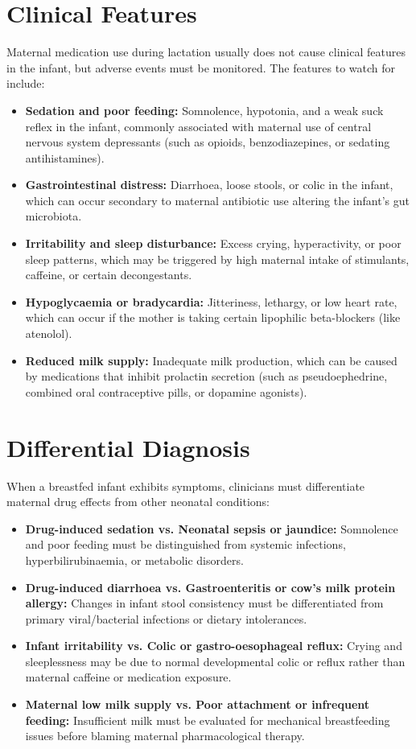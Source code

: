 \section*{Clinical Features}
Maternal medication use during lactation usually does not cause clinical features in the infant, but adverse events must be monitored. The features to watch for include:
\begin{itemize}
    \item \textbf{Sedation and poor feeding:} Somnolence, hypotonia, and a weak suck reflex in the infant, commonly associated with maternal use of central nervous system depressants (such as opioids, benzodiazepines, or sedating antihistamines).
    \item \textbf{Gastrointestinal distress:} Diarrhoea, loose stools, or colic in the infant, which can occur secondary to maternal antibiotic use altering the infant's gut microbiota.
    \item \textbf{Irritability and sleep disturbance:} Excess crying, hyperactivity, or poor sleep patterns, which may be triggered by high maternal intake of stimulants, caffeine, or certain decongestants.
    \item \textbf{Hypoglycaemia or bradycardia:} Jitteriness, lethargy, or low heart rate, which can occur if the mother is taking certain lipophilic beta-blockers (like atenolol).
    \item \textbf{Reduced milk supply:} Inadequate milk production, which can be caused by medications that inhibit prolactin secretion (such as pseudoephedrine, combined oral contraceptive pills, or dopamine agonists).
\end{itemize}

\section*{Differential Diagnosis}
When a breastfed infant exhibits symptoms, clinicians must differentiate maternal drug effects from other neonatal conditions:
\begin{itemize}
    \item \textbf{Drug-induced sedation vs. Neonatal sepsis or jaundice:} Somnolence and poor feeding must be distinguished from systemic infections, hyperbilirubinaemia, or metabolic disorders.
    \item \textbf{Drug-induced diarrhoea vs. Gastroenteritis or cow's milk protein allergy:} Changes in infant stool consistency must be differentiated from primary viral/bacterial infections or dietary intolerances.
    \item \textbf{Infant irritability vs. Colic or gastro-oesophageal reflux:} Crying and sleeplessness may be due to normal developmental colic or reflux rather than maternal caffeine or medication exposure.
    \item \textbf{Maternal low milk supply vs. Poor attachment or infrequent feeding:} Insufficient milk must be evaluated for mechanical breastfeeding issues before blaming maternal pharmacological therapy.
\end{itemize}

